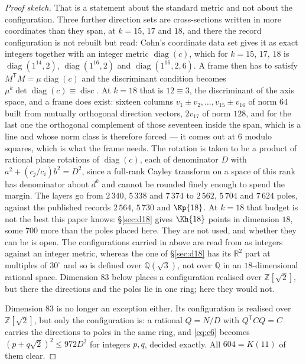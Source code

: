 \documentclass[11pt]{amsart}
\theoremstyle{remark}
\newcommand{\R}{\mathbb{R}}
\newcommand{\Z}{\mathbb{Z}}
\newcommand{\Q}{\mathbb{Q}}
\begin{document}
\begin{proof}[Proof sketch]
That is a statement about the standard metric and not about the configuration. Three further
direction sets are cross-sections written in more coordinates than they span, at $k=15$,
$17$ and $18$, and there the record configuration is not rebuilt but read: Cohn's
coordinate data set gives it as exact integers together with an integer metric
$\operatorname{diag}(c)$, which for $k=15$, $17$, $18$ is
$\operatorname{diag}(1^{14},2)$, $\operatorname{diag}(1^{16},2)$ and
$\operatorname{diag}(1^{16},2,6)$. A frame then has to satisfy
$M^{\mathsf T}M=\mu\operatorname{diag}(c)$ and the discriminant condition becomes
$\mu^k\det\operatorname{diag}(c)\equiv\operatorname{disc}$. At $k=18$ that is
$12\equiv3$, the discriminant of the axis space, and a frame does exist: sixteen columns
$v_1\pm v_2,\dots,v_{15}\pm v_{16}$ of norm $64$ built from mutually orthogonal direction
vectors, $2v_{17}$ of norm $128$, and for the last one the orthogonal complement of those
seventeen inside the span, which is a line and whose norm class is therefore forced --- it
comes out at $6$ modulo squares, which is what the frame needs. The rotation is taken to be
a product of rational plane rotations of $\operatorname{diag}(c)$, each of denominator $D$
with $a^2+(c_j/c_i)b^2=D^2$, since a full-rank Cayley transform on a space of this rank has
denominator about $d^k$ and cannot be rounded finely enough to spend the margin. The layers
go from $2\,340$, $5\,338$ and $7\,374$ to $2\,562$, $5\,704$ and $7\,624$ poles, against the published records $2\,564$, $5\,730$ and $\Kp{18}$.
At $k=18$ that budget is not the best this paper knows: \S\ref{sec:d18} gives $\Kh{18}$ points in dimension $18$, some $700$ more than the poles placed here. They are not used, and whether they can be is open. The configurations carried in above are read from \cite{cohn-data} as integers against an integer metric, whereas the one of \S\ref{sec:d18} has its $\R^{2}$ part at multiples of $30^{\circ}$ and so is defined over $\Q(\sqrt3)$, not over $\Q$ in an $18$-dimensional rational space. Dimension $83$ below places a configuration realised over $\Z[\sqrt2]$, but there the directions and the poles lie in one ring; here they would not.

Dimension $83$ is no longer an exception either. Its configuration is realised over
$\Z[\sqrt2]$, but only the configuration is: a rational $Q=N/D$ with $Q^{\mathsf T}CQ=C$
carries the directions to poles in the same ring, and \eqref{eq:c6} becomes
$(p+q\sqrt2)^2\le972D^2$ for integers $p,q$, decided exactly. All $604 = K(11)$ of them
clear.
\end{proof}
\end{document}
